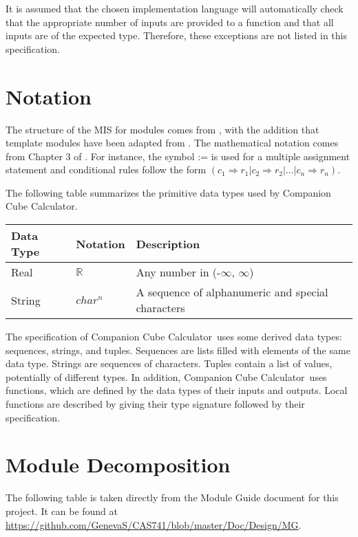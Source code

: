 \documentclass[12pt, titlepage]{article}
\newcommand{\progname}{Companion Cube Calculator}
\begin{document}
It is assumed that the chosen implementation language will automatically check 
that the appropriate number of inputs are provided to a function and that all 
inputs are of the expected type. Therefore, these exceptions are not listed in 
this specification.

\section{Notation}

The structure of the MIS for modules comes from \citet{HoffmanAndStrooper1995},
with the addition that template modules have been adapted from
\cite{GhezziEtAl2003}.  The mathematical notation comes from Chapter 3 of
\citet{HoffmanAndStrooper1995}.  For instance, the symbol := is used for a
multiple assignment statement and conditional rules follow the form $(c_1
\Rightarrow r_1 | c_2 \Rightarrow r_2 | ... | c_n \Rightarrow r_n )$.

The following table summarizes the primitive data types used by \progname. 

\begin{center}
\renewcommand{\arraystretch}{1.2}
\noindent 
\begin{tabular}{l l p{7.5cm}} 
\toprule 
\textbf{Data Type} & \textbf{Notation} & \textbf{Description}\\ 
\midrule
Real & $\mathbb{R}$ & Any number in (-$\infty$, $\infty$)\\
\multirow{2}{1cm}{String} & \multirow{2}{1cm}{$char^n$} & A sequence of 
alphanumeric and special characters\\
\bottomrule
\end{tabular} 
\end{center}

\noindent
The specification of \progname \ uses some derived data types: sequences, strings, and
tuples. Sequences are lists filled with elements of the same data type. Strings
are sequences of characters. Tuples contain a list of values, potentially of
different types. In addition, \progname \ uses functions, which
are defined by the data types of their inputs and outputs. Local functions are
described by giving their type signature followed by their specification.

\newpage
\section{Module Decomposition}

The following table is taken directly from the Module Guide document for this 
project. It can be found at 
\url{https://github.com/GenevaS/CAS741/blob/master/Doc/Design/MG}.
\end{document}
